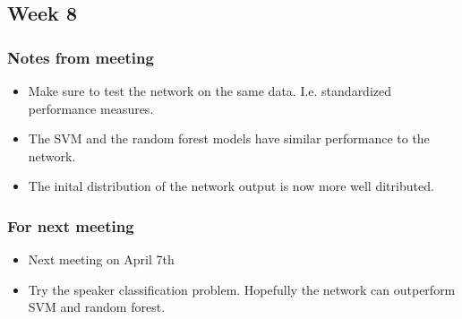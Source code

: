 
\subsection{Week 8}

\subsubsection{Notes from meeting}

\begin{itemize}
\item Make sure to test the network on the same data. I.e. standardized performance measures.
\item The SVM and the random forest models have similar performance to the network.
\item The inital distribution of the network output is now more well ditributed. 
\end{itemize}

\subsubsection{For next meeting}

\begin{itemize}
\item Next meeting on April 7th
\item Try the speaker classification problem. Hopefully the network can outperform
SVM and random forest.
\end{itemize}
